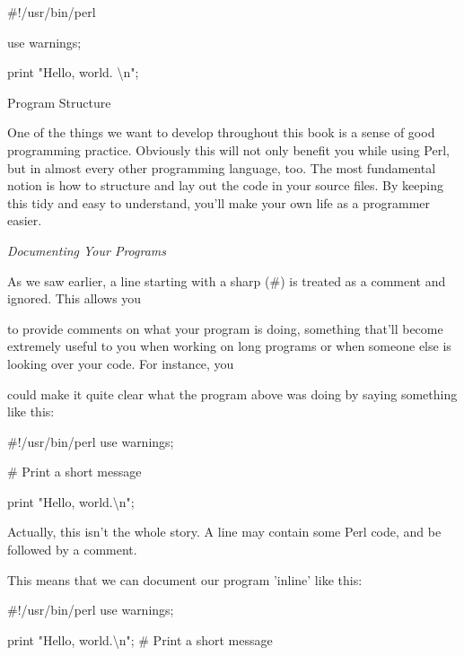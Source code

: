\documentclass[a4paper,11pt]{book}
\begin{document}
\noindent 

\noindent \#!/usr/bin/perl

\noindent use warnings;

\noindent 

\noindent print "Hello, world. \textbackslash n";

\noindent 

\noindent Program Structure

\noindent 

\noindent One of the things we want to develop throughout this book is a sense of good programming practice. Obviously this will not only benefit you while using Perl, but in almost every other programming language, too. The most fundamental notion is how to structure and lay out the code in your source files. By keeping this tidy and easy to understand, you'll make your own life as a programmer easier.

\noindent 

\noindent \textit{Documenting Your Programs}

\noindent As we saw earlier, a line starting with a sharp (\#) is treated as a comment and ignored. This allows you

\noindent to provide comments on what your program is doing, something that'll become extremely useful to you when working on long programs or when someone else is looking over your code. For instance, you

\noindent could make it quite clear what the program above was doing by saying something like this:

\noindent 

\noindent \#!/usr/bin/perl use warnings;

\noindent 

\noindent \# Print a short message

\noindent print "Hello, world.\textbackslash n";

\noindent 

\noindent 

\noindent Actually, this isn't the whole story. A line may contain some Perl code, and be followed by a comment.

\noindent This means that we can document our program 'inline' like this:

\noindent 

\noindent 

\noindent \#!/usr/bin/perl use warnings;

\noindent 

\noindent print "Hello, world.\textbackslash n"; \# Print a short message
\end{document}
